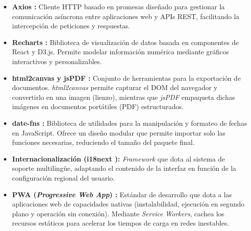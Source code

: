 \begin{itemize}
\begin{itemize}
    \end{itemize}
    \item \textbf{Axios \cite{axios}:} Cliente HTTP basado en promesas diseñado para gestionar la comunicación asíncrona entre aplicaciones web y APIs REST, facilitando la intercepción de peticiones y respuestas.
    \item \textbf{Recharts \cite{recharts}:} Biblioteca de visualización de datos basada en componentes de React \cite{react} y D3.js. Permite modelar información numérica mediante gráficos interactivos y personalizables.
    \item \textbf{html2canvas \cite{html2canvas} y jsPDF \cite{jspdf}:} Conjunto de herramientas para la exportación de documentos. \textit{html2canvas} \cite{html2canvas} permite capturar el DOM del navegador y convertirlo en una imagen (lienzo), mientras que \textit{jsPDF} \cite{jspdf} empaqueta dichas imágenes en documentos portátiles (PDF) estructurados.
    \item \textbf{date-fns \cite{datefns}:} Biblioteca de utilidades para la manipulación y formateo de fechas en JavaScript. Ofrece un diseño modular que permite importar solo las funciones necesarias, reduciendo el tamaño del paquete final.
    \item \textbf{Internacionalización (i18next \cite{i18next}):} \textit{Framework} que dota al sistema de soporte multilingüe, adaptando el contenido de la interfaz en función de la configuración regional del usuario.
    \item \textbf{PWA (\textit{Progressive Web App}) \cite{vitepwa}:} Estándar de desarrollo que dota a las aplicaciones web de capacidades nativas (instalabilidad, ejecución en segundo plano y operación sin conexión). Mediante \textit{Service Workers}, cachea los recursos estáticos para acelerar los tiempos de carga en redes inestables.
\end{itemize}

